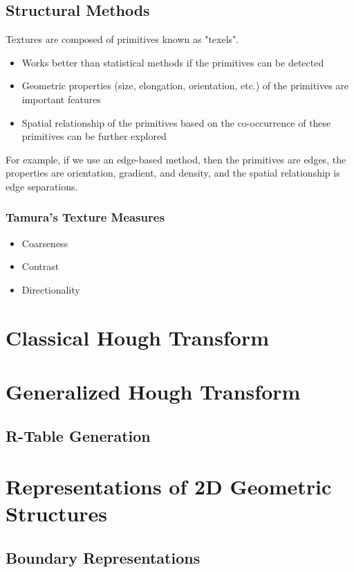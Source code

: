 \documentclass{article}
\begin{document}
\begin{multicols}{2}
\subsection{Structural Methods}

Textures are composed of primitives known as "texels".

\begin{itemize}
  \item {Works better than statistical methods if the primitives can be detected}
  \item {Geometric properties (size, elongation, orientation, etc.) of the primitives are important features}
  \item {Spatial relationship of the primitives based on the co-occurrence of these primitives can be further explored}
\end{itemize}

For example, if we use an edge-based method, then the primitives are edges, the properties are orientation, gradient, and density, and the spatial relationship is edge separations.

\subsubsection{Tamura's Texture Measures}

\begin{itemize}
  \item {Coarseness}
  \item {Contrast}
  \item {Directionality}
\end{itemize}

 \section{Classical Hough Transform}

 \section{Generalized Hough Transform}
 \subsection{R-Table Generation}

 \section{Representations of 2D Geometric Structures}
 \subsection{Boundary Representations}

\end{multicols}
\end{document}
